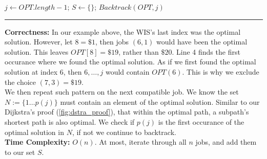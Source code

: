 \begin{Func}
    \vspace{-.5em}
    \begin{algorithm}[H]
        \SetAlgoLined
        $j \gets OPT.length-1$; $S \gets \{\}$; 
        $Backtrack(OPT, j)$\;
    \end{algorithm}
    \noindent
    \rule{\textwidth}{0.4pt}
    \textbf{Correctness:} In our example above, the WIS's last index was the optimal solution. However, let $8=\$1$, then
    jobs $(6,1)$ would have been the optimal solution. This leaves $OPT[8]=\$19$, rather than $\$20$. Line 4 finds the first occurance where
    we found the optimal solution. As if we first found the optimal solution at index $6$, then $6,\dots,j$ would contain $OPT(6)$. This is why
    we exclude the choice $(7,3)=\$19$.\\

    \noindent
    We then repeat such pattern on the next compatible job. We know the set $N:=\{1\dots p(j)\}$ must contain an element of the optimal solution.
    Similar to our Dijkstra's proof (\ref{fig:dstra_proof}), that within the optimal path, a subpath's shortest path is also optimal. We check if
    $p(j)$ is the first occurance of the optimal solution in $N$, if not we continue to backtrack.\\

    \noindent
    \textbf{Time Complexity:} $O(n)$. At most, iterate through all $n$ jobs, and add them to our set $S$.
\end{Func}

\newpage

